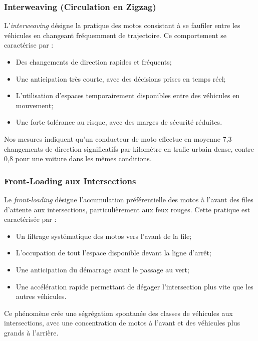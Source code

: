\subsubsection{Interweaving (Circulation en Zigzag)}
\label{subsubsec:interweaving}

L'\textit{interweaving} désigne la pratique des motos consistant à se faufiler entre les véhicules en changeant fréquemment de trajectoire. Ce comportement se caractérise par :

\begin{itemize}
\item Des changements de direction rapides et fréquents;
\item Une anticipation très courte, avec des décisions prises en temps réel;
\item L'utilisation d'espaces temporairement disponibles entre des véhicules en mouvement;
\item Une forte tolérance au risque, avec des marges de sécurité réduites.
\end{itemize}

Nos mesures indiquent qu'un conducteur de moto effectue en moyenne 7,3 changements de direction significatifs par kilomètre en trafic urbain dense, contre 0,8 pour une voiture dans les mêmes conditions.

\subsubsection{Front-Loading aux Intersections}
\label{subsubsec:front_loading}

Le \textit{front-loading} désigne l'accumulation préférentielle des motos à l'avant des files d'attente aux intersections, particulièrement aux feux rouges. Cette pratique est caractérisée par :

\begin{itemize}
\item Un filtrage systématique des motos vers l'avant de la file;
\item L'occupation de tout l'espace disponible devant la ligne d'arrêt;
\item Une anticipation du démarrage avant le passage au vert;
\item Une accélération rapide permettant de dégager l'intersection plus vite que les autres véhicules.
\end{itemize}

Ce phénomène crée une ségrégation spontanée des classes de véhicules aux intersections, avec une concentration de motos à l'avant et des véhicules plus grands à l'arrière.

